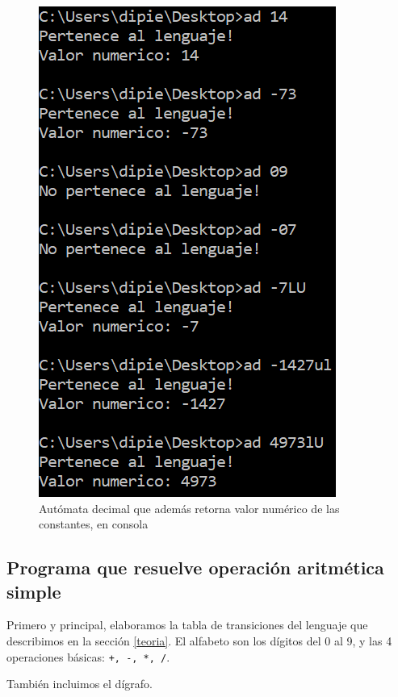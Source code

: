 \documentclass[a4paper, 12pt]{article}
\begin{document}
\begin{figure}[b]
    \centering
    \includegraphics{images/automataDecimal2.PNG}
    \caption{Autómata decimal que además retorna valor numérico de las constantes, en consola}
    \label{fig:decimal-consola}
\end{figure}


\subsection{Programa que resuelve operación aritmética simple}
\label{ej-operacion}
\medbreak

Primero y principal, elaboramos la tabla de transiciones del lenguaje que describimos en la sección \ref{teoria}. El alfabeto son los dígitos del 0 al 9, y las 4 operaciones básicas: \texttt{+, -, *, /}.

También incluimos el dígrafo.
\end{document}
